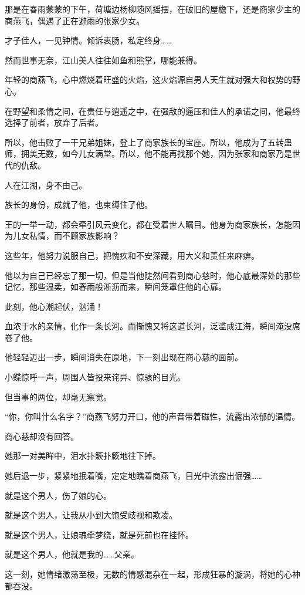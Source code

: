 \begin{this_body}
那是在春雨蒙蒙的下午，荷塘边杨柳随风摇摆，在破旧的屋檐下，还是商家少主的商燕飞，偶遇了正在避雨的张家少女。

才子佳人，一见钟情。倾诉衷肠，私定终身……

然而世事无奈，江山美人往往如鱼和熊掌，哪能兼得。

年轻的商燕飞，心中燃烧着旺盛的火焰，这火焰源自男人天生就对强大和权势的野心。

在野望和柔情之间，在责任与逍遥之中，在强敌的逼压和佳人的承诺之间，他最终选择了前者，放弃了后者。

所以，他击败了一干兄弟姐妹，登上了商家族长的宝座。所以，他成为了五转蛊师，拥美无数，如今儿女满堂。所以，他不能再找那个她，因为张家和商家乃是世代的仇敌。

人在江湖，身不由己。

族长的身份，成就了他，也束缚住了他。

王的一举一动，都会牵引风云变化，都在受着世人瞩目。他身为商家族长，怎能因为儿女私情，而不顾家族影响？

这些年，他努力说服自己，把愧疚和不安深藏，用大义和责任来麻痹。

他以为自己已经忘了那一切，但是当他陡然间看到商心慈时，他心底最深处的那些记忆，那些温柔，如春雨般淅沥而来，瞬间笼罩住他的心扉。

此刻，他心潮起伏，汹涌！

血浓于水的亲情，化作一条长河。而惭愧又将这道长河，泛滥成江海，瞬间淹没席卷了他。

他轻轻迈出一步，瞬间消失在原地，下一刻出现在商心慈的面前。

小蝶惊呼一声，周围人皆投来诧异、惊骇的目光。

但当事的两位，却毫无察觉。

“你，你叫什么名字？”商燕飞努力开口，他的声音带着磁性，流露出浓郁的温情。

商心慈却没有回答。

她那一对美眸中，泪水扑簌扑簌地往下掉。

她后退一步，紧紧地抿着嘴，定定地瞧着商燕飞，目光中流露出倔强……

就是这个男人，伤了娘的心。

就是这个男人，让我从小到大饱受歧视和欺凌。

就是这个男人，让娘魂牵梦绕，就是死前也在挂怀。

就是这个男人，他就是我的……父亲。

这一刻，她情绪激荡至极，无数的情感混杂在一起，形成狂暴的漩涡，将她的心神都吞没。


\end{this_body}
